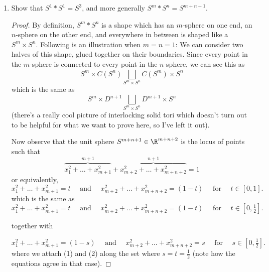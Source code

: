 \documentclass[12pt,letterpaper]{article}
\begin{document}
\begin{enumerate}
\begin{proof}
\begin{enumerate}[label=(\arabic*)]
	\item[$(i)$] For each $i\geq2$, let $F_i$ be the homotopy which deformation retracts $\langle e^i_a \rangle$ (the $a$-th i-hemisphere) to $e^0_a$. We know we can do this because each hemisphere is a disk which contains $e^0_a$. This has the effect of retracting all of $S^{i-1}$ to $e^0_a$. 
	\end{enumerate}
Now we concatenate all of these homotopies, allotting time $\frac{1}{2^i}$ for each $F_i$, so that they are all completed as $t$ goes from 0 to 1. Every $S^i\subset S^\infty$ is deformation retracted to the point $e^0_a$ by the time $t=1-2^{-(i+1)}$, so $S^\infty$ is contractible. 
\end{proof}

\pagebreak
\setcounter{enumi}{17}
\item Show that $S^1 * S^1 = S^3$, and more generally $S^m * S^n = S^{m+n+1}$. 
\begin{proof}
By definition, $S^m*S^n$ is a shape which has an $m$-sphere on one end, an $n$-sphere on the other end, and everywhere in between is shaped like a $S^m\times S^n$. Following is an illustration when $m=n=1$:
We can consider two halves of this shape, glued together on their boundaries. Since every point in the $m$-sphere is connected to every point in the $n$-sphere, we can see this as 
$$ S^m\times C(S^n)\bigsqcup_{S^m\times S^n} C(S^m)\times S^n$$
which is the same as 
$$ S^m\times D^{n+1}\bigsqcup_{S^m\times S^n} D^{m+1}\times S^n$$
(there's a really cool picture of interlocking solid tori which doesn't turn out to be helpful for what we want to prove here, so I've left it out). 

Now observe that the unit sphere $S^{m+n+1}\in\R^{m+n+2}$ is the locus of points such that
$$\overbrace{x_1^2+\dots+x_{m+1}^2}^{m+1} + \overbrace{x_{m+2}^2+\dots+x_{m+n+2}^2}^{n+1}=1$$
or equivalently, 
\begin{equation*}
x_1^2+\dots+x_{m+1}^2 = t \quad \text{ and } \quad x_{m+2}^2+\dots+x_{m+n+2}^2=(1-t) \quad \text{ for } \quad t\in[0,1].
\end{equation*}
which is the same as 
\begin{equation}
x_1^2+\dots+x_{m+1}^2 = t \quad \text{ and } \quad x_{m+2}^2+\dots+x_{m+n+2}^2=(1-t) \quad \text{ for } \quad t\in[0,\tfrac{1}{2}].
\end{equation}
\begin{center}
together with 
\end{center}
\begin{equation}
x_1^2+\dots+x_{m+1}^2 = (1-s) \quad \text{ and } \quad x_{m+2}^2+\dots+x_{m+n+2}^2=s \quad \text{ for } \quad s\in[0,\tfrac{1}{2}].
\end{equation}
where we attach (1) and (2) along the set where $s=t=\frac{1}{2}$ (note how the equations agree in that case). 


\end{proof}
\end{enumerate}
\end{document}
